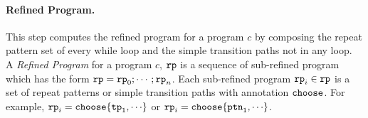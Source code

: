 \paragraph{Refined Program.} This step computes the refined program for a program $c$ by composing the
repeat pattern set of every while loop and the simple transition paths not in any loop.
\\
A \emph{Refined Program} for a program $c$, $\mathtt{rp}$ is a sequence of
sub-refined program which
has the form $\mathtt{rp} = \mathtt{rp}_0; \cdots; \mathtt{rp}_n$.
Each sub-refined program
$\mathtt{rp}_i \in \mathtt{rp}$ is
a set of repeat patterns or simple transition paths with annotation $\mathtt{choose}$.
For example, $\rprog_i = \rpchoose{\tpath_1, \cdots}$ or
$\rprog_i = \rpchoose{\rpattern_1, \cdots}$.
